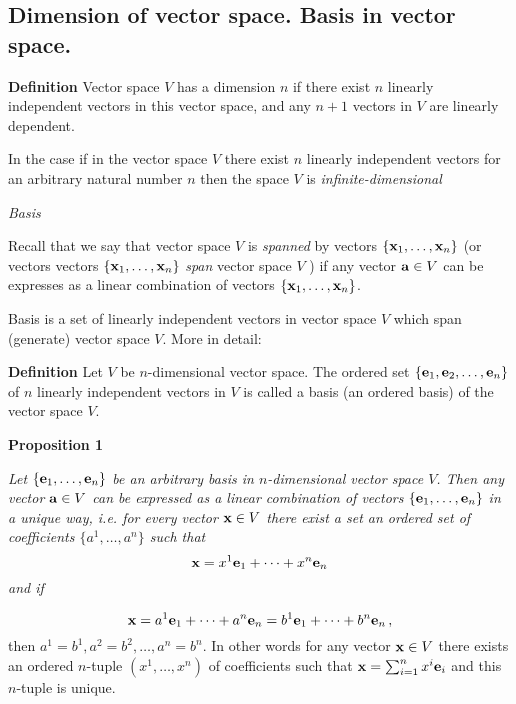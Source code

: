 \documentclass[12pt]{article}
\numberwithin{equation}{section}
\begin{document}
   \subsection {Dimension of vector space. Basis in vector space.}


{\bf Definition }  Vector space $V$ has a dimension $n$  if there exist $n$  linearly independent vectors
in this vector space, and  any $n+1$ vectors in $V$ are  linearly dependent.

{\footnotesize In the
case if in the vector space $V$ there exist $n$  linearly independent vectors for an arbitrary
natural number $n$ then the space $V$ is {\it infinite-dimensional} }

\m


  {\it Basis}

 Recall that we say that vector space $V$  is {\it spanned} by vectors $\{{\bf x}_1,\dots,{\bf x}_n\}$
(or vectors vectors $\{{\bf x}_1,\dots,{\bf x}_n\}$ {\it span} vector space $V$ ) if any vector ${\bf a}\in V$
can be expresses as a linear combination of vectors $\{{\bf x}_1,\dots,{\bf x}_n\}$.

\smallskip

Basis is a set of  linearly independent vectors in vector space $V$ which span (generate) vector space   $V$.
More in detail:

 {\bf Definition}
 Let $V$ be $n$-dimensional vector space.  The ordered set $\{{\bf e}_1,{\bf e}_2,\dots,{\bf e}_n\}$
 of $n$  linearly independent vectors in $V$ is called a basis (an ordered basis) of the vector space
 $V$.
\m

 {\bf Proposition 1}
 {\it Let $\{{\bf e}_1,\dots,{\bf e}_n\}$ be an arbitrary basis in $n$-dimensional vector space $V$.
 Then any vector ${\bf a}\in V$ can be expressed as a linear combination of vectors
 $\{{\bf e}_1,\dots,{\bf e}_n\}$ in a unique way, i.e.
  for every vector ${\bf x}\in V$ there exist a set an ordered set of coefficients $\{a^1,\dots,a^n\}$ such that
                            \begin{equation}\label{expansionofvector}
      {\bf x}=x^1{\bf e}_1+\dots+x^n{\bf e}_n
                            \end{equation}
 and if

                      \begin{equation}\label{uniquenessofexpansion}
      {\bf x}=a^1{\bf e}_1+\dots+a^n{\bf e}_n=b^1{\bf e}_1+\dots+b^n{\bf e}_n\,,
                            \end{equation}
 then $a^1=b^1, a^2=b^2,\dots,a^n=b^n$. In other words
for any vector ${\bf x}\in V$ there exists an ordered $n$-tuple $(x^1,\dots,x^n)$ of coefficients
  such that  ${\bf x}=\sum_{i=1}^nx^i{\bf e}_i$  and this $n$-tuple is unique.}
\end{document}
